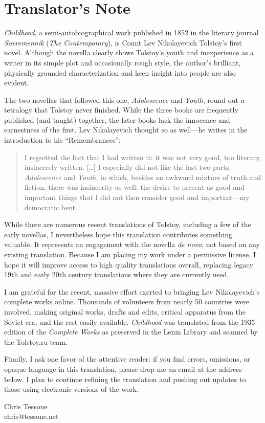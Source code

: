 \chapter{Translator's Note}

\textit{Childhood}, a semi-autobiographical work published in 1852 in the literary journal \textit{Sovremennik} (\textit{The Contemporary}), is Count Lev Nikolayevich Tolstoy's first novel. Although the novella clearly shows Tolstoy's youth and inexperience as a writer in its simple plot and occasionally rough style, the author's brilliant, physically grounded characterization and keen insight into people are also evident.

The two novellas that followed this one, \textit{Adolescence} and \textit{Youth}, round out a tetralogy that Tolstoy never finished. While the three books are frequently published (and taught) together, the later books lack the innocence and earnestness of the first. Lev Nikolayevich thought so as well---he writes in the introduction to his ``Remembrances'':

\begin{quotation}
I regretted the fact that I had written it: it was not very good, too literary, insincerely written. [\ldots{}] I especially did not like the last two parts, \textit{Adolescence} and \textit{Youth}, in which, besides an awkward mixture of truth and fiction, there was insincerity as well: the desire to present as good and important things that I did not then consider good and important---my democratic bent.
\end{quotation}

While there are numerous recent translations of Tolstoy, including a few of the early novellas, I nevertheless hope this translation contributes something valuable. It represents an engagement with the novella \textit{de novo}, not based on any existing translation. Because I am placing my work under a permissive license, I hope it will improve access to high quality translations overall, replacing legacy 19th and early 20th century translations where they are currently used.

I am grateful for the recent, massive effort exerted to bringing Lev Nikolayevich's complete works online. Thousands of volunteers from nearly 50 countries were involved, making original works, drafts and edits, critical apparatus from the Soviet era, and the rest easily available. \textit{Childhood} was translated from the 1935 edition of the \textit{Complete Works} as preserved in the Lenin Library and scanned by the Tolstoy.ru team.

Finally, I ask one favor of the attentive reader: if you find errors, omissions, or opaque language in this translation, please drop me an email at the address below. I plan to continue refining the translation and pushing out updates to those using electronic versions of the work.

\begin{flushright}
Chris Tessone\\
chris@tessone.net
\end{flushright}
